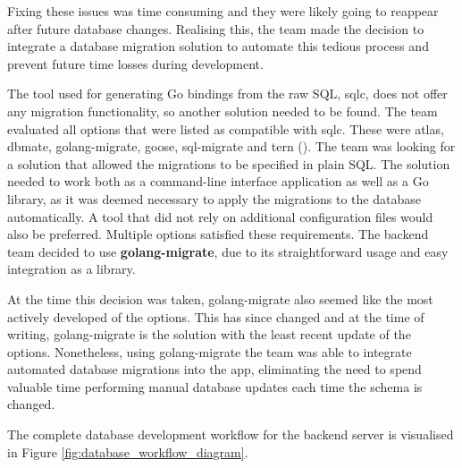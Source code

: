 Fixing these issues was time consuming and they were likely going to reappear
after future database changes. Realising this, the team made the decision to
integrate a database migration solution to automate this tedious process and
prevent future time losses during development.

The tool used for generating Go bindings from the raw SQL, sqlc, does not offer
any migration functionality, so another solution needed to be found. The team
evaluated all options that were listed as compatible with sqlc. These were
atlas, dbmate, golang-migrate, goose, sql-migrate and tern
(\cite{sqlc_updating_database_schema}). The team was looking for a solution that
allowed the migrations to be specified in plain SQL. The solution needed to work
both as a command-line interface application as well as a Go library, as it was
deemed necessary to apply the migrations to the database automatically. A tool
that did not rely on additional configuration files would also be preferred.
Multiple options satisfied these requirements. The backend team decided to use
\textbf{golang-migrate}, due to its straightforward usage and easy integration as a
library.

At the time this decision was taken, golang-migrate also seemed like
the most actively developed of the options. This has since changed and at the
time of writing, golang-migrate is the solution with the least recent update of
the options. Nonetheless, using golang-migrate the team was able to integrate automated
database migrations into the app, eliminating the need to spend valuable time
performing manual database updates each time the schema is changed.

The complete database development workflow for the backend server is visualised
in Figure \ref{fig:database_workflow_diagram}.

